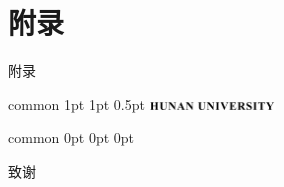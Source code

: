 \documentclass[
    report,     %
    oneside,    %
    UTF8,       %
    zihao=-4    %
]{config} %
\begin{document}

\begin{references}
\end{references}


\StartAppendix %

\chapter{附录}

附录


\Header
    {common} %
    {1pt} %
    {1pt} %
    {0.5pt} %
    {} %
    {\includegraphics[width=0.25\textwidth]{figures/logos/HNU-title-EN.png}} %
    {} %


\Footer
    {common} %
    {0pt} %
    {0pt} %
    {0pt} %
    {} %
    {\thepage} %
    {} %




\StartAcknowledgements %

致谢
\end{document}

